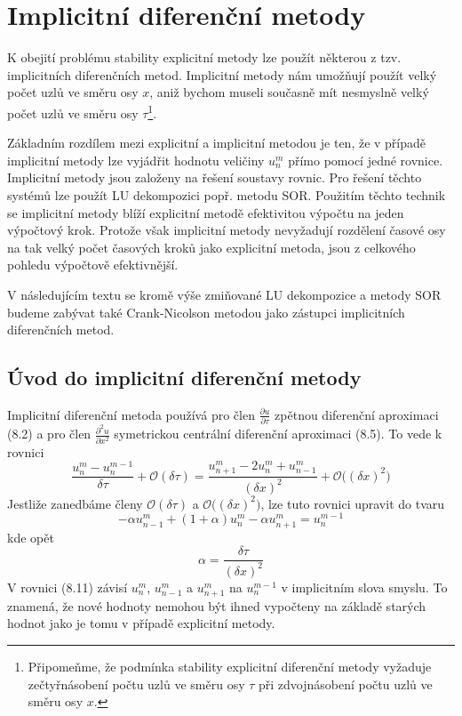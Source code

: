 \documentclass[a4paper]{book}
\begin{document}
\section{Implicitní diferenční metody}

K obejití problému stability explicitní metody lze použít některou z tzv. implicitních diferenčních metod. Implicitní metody nám umožňují použít velký počet uzlů ve směru osy $x$, aniž bychom museli současně mít nesmyslně velký počet uzlů ve směru osy $\tau$\footnote{Připomeňme, že podmínka stability explicitní diferenční metody vyžaduje zečtyřnásobení počtu uzlů ve směru osy $\tau$ při zdvojnásobení počtu uzlů ve směru osy $x$.}.

Základním rozdílem mezi explicitní a implicitní metodou je ten, že v případě implicitní metody lze vyjádřit hodnotu veličiny $u_n^m$ přímo pomocí jedné rovnice. Implicitní metody jsou založeny na řešení soustavy rovnic. Pro řešení těchto systémů lze použít LU dekompozici popř. metodu SOR. Použitím těchto technik se implicitní metody blíží explicitní metodě efektivitou výpočtu na jeden výpočtový krok. Protože však implicitní metody nevyžadují rozdělení časové osy na tak velký počet časových kroků jako explicitní metoda, jsou z celkového pohledu výpočtově efektivnější.

V následujícím textu se kromě výše zmiňované LU dekompozice a metody SOR budeme zabývat také Crank-Nicolson metodou jako zástupci implicitních diferenčních metod.

\subsection{Úvod do implicitní diferenční metody}

Implicitní diferenční metoda používá pro člen $\frac{\partial u}{\partial \tau}$ zpětnou diferenční aproximaci (8.2) a pro člen $\frac{\partial^2 u}{\partial x^2}$ symetrickou centrální diferenční aproximaci (8.5). To vede k rovnici
\begin{equation*}
\frac{u_n^m - u_n^{m-1}}{\delta \tau} + \mathcal{O}(\delta \tau) = \frac{u_{n+1}^m - 2u_n^m + u_{n-1}^m}{(\delta x)^2} + \mathcal{O}\Big( (\delta x)^2 \Big)
\end{equation*}
Jestliže zanedbáme členy $\mathcal{O}(\delta \tau)$ a $\mathcal{O}\Big( (\delta x)^2 \Big)$, lze tuto rovnici upravit do tvaru
\begin{equation}
- \alpha u_{n - 1}^m + (1 + \alpha)u_n^m - \alpha u_{n + 1}^m = u_n^{m-1}
\end{equation}
kde opět
\begin{equation*}
\alpha = \frac{\delta \tau}{(\delta x)^2}
\end{equation*}
V rovnici (8.11) závisí $u_n^m$, $u_{n-1}^m$ a $u_{n+1}^m$ na $u_n^{m-1}$ v implicitním slova smyslu. To znamená, že nové hodnoty nemohou být ihned vypočteny na základě starých hodnot jako je tomu v případě explicitní metody.
\end{document}
